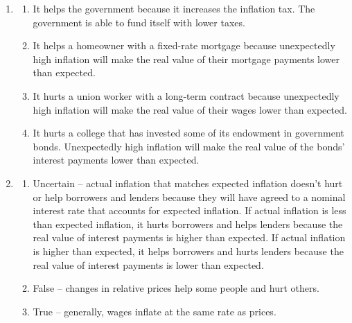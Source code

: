 \documentclass{article}
\begin{document}
\begin{enumerate}
Inflation makes money a worse store of value because it depreciates money. 

\item

	\begin{enumerate}
	
	\item It helps the government because it increases the inflation tax. The government is able to fund itself with lower taxes.
	
	\item It helps a homeowner with a fixed-rate mortgage because unexpectedly high inflation will make the real value of their mortgage payments lower than expected. 
	
	\item It hurts a union worker with a long-term contract because unexpectedly high inflation will make the real value of their wages lower than expected.
	
	\item It hurts a college that has invested some of its endowment in government bonds. Unexpectedly high inflation will make the real value of the bonds' interest payments lower than expected.
	
	\end{enumerate}
	
\item

	\begin{enumerate}
	
	\item Uncertain -- actual inflation that matches expected inflation doesn't hurt or help borrowers and lenders because they will have agreed to a nominal interest rate that accounts for expected inflation. If actual inflation is less than expected inflation, it hurts borrowers and helps lenders because the real value of interest payments is higher than expected. If actual inflation is higher than expected, it helps borrowers and hurts lenders because the real value of interest payments is lower than expected. 
	
	\item False -- changes in relative prices help some people and hurt others.
	
	\item True -- generally, wages inflate at the same rate as prices.
	
	\end{enumerate}

\end{enumerate}
\end{document}
